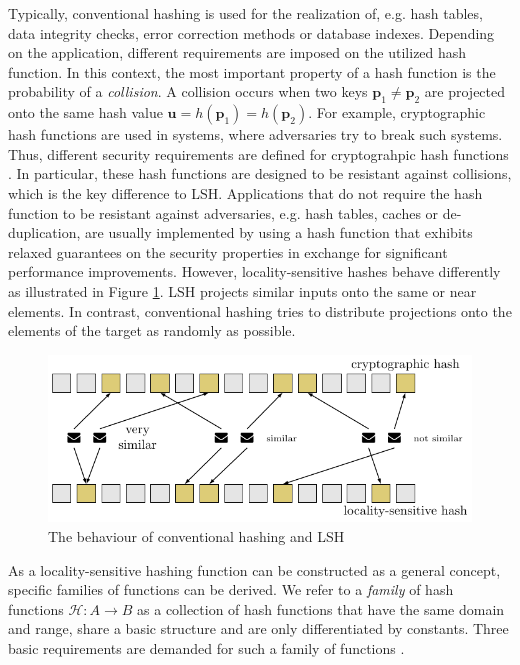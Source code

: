 Typically, conventional hashing is used for the realization of, e.g. hash tables, data integrity checks, error correction methods or database indexes. Depending on the application, different requirements are imposed on the utilized hash function. In this context, the most important property of a hash function is the probability of a \textit{collision}. A collision occurs when two keys $\bm{p}_1 \neq \bm{p}_2$ are projected onto the same hash value $\bm{u} = h(\bm{p}_1) = h(\bm{p}_2)$. For example, cryptographic hash functions are used in systems, where adversaries try to break such systems. Thus, different security requirements are defined for cryptograhpic hash functions \cite[349]{williamcryptography}. In particular, these hash functions are designed to be resistant against collisions, which is the key difference to LSH. Applications that do not require the hash function to be resistant against adversaries, e.g. hash tables, caches or de-duplication, are usually implemented by using a hash function that exhibits relaxed guarantees on the security properties in exchange for significant performance improvements. However, locality-sensitive hashes behave differently as illustrated in Figure \ref{fig:hashing_differences}. LSH projects similar inputs onto the same or near elements. In contrast, conventional hashing tries to distribute projections onto the elements of the target as randomly as possible.

\begin{figure}[t!]
    \centering
    \includegraphics[width=0.8\linewidth]{tikz/hashing_differences.pdf}
    \caption{The behaviour of conventional hashing and LSH}
    \label{fig:hashing_differences}
\end{figure}







As a locality-sensitive hashing function can be constructed as a general concept, specific families of functions can be derived. We refer to a \textit{family} of hash functions $\mathcal{H}: A \rightarrow B$ as a collection of hash functions that have the same domain and range, share a basic structure and are only differentiated by constants. Three basic requirements are demanded for such a family of functions \cite[99]{leskovec_rajaraman_ullman_2014}.

